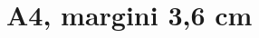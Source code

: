 \documentclass[a4paper,11pt]{article}
\begin{document}
\section*{A4, margini 3,6 cm}
\lipsum[1-9]
\end{document}

